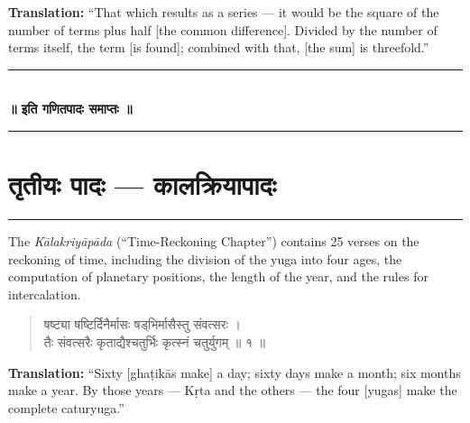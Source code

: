 \documentclass[11pt,a4paper]{article}
\newcommand{\dev}[1]{{\devanagarifont #1}}
\newenvironment{sanskritverse}{\begin{verse}\devanagarifont\large\centering}{\end{verse}}
\begin{document}
\vspace{0.3cm}
\noindent\textbf{Translation:} ``That which results as a series --- it would be the square of the number of terms plus half [the common difference]. Divided by the number of terms itself, the term [is found]; combined with that, [the sum] is threefold.''

\vspace{0.5cm}

\begin{center}
\textcolor{rulecolor}{\rule{0.6\textwidth}{0.4pt}}\\[0.5em]
\textbf{\dev{॥ इति गणितपादः समाप्तः ॥}}\\[0.3em]
\textcolor{rulecolor}{\rule{0.6\textwidth}{0.4pt}}
\end{center}

\clearpage

\section*{\dev{तृतीयः पादः — कालक्रियापादः}}

\begin{center}
\textcolor{rulecolor}{\rule{0.8\textwidth}{0.6pt}}
\end{center}

\noindent
The \textit{Kālakriyāpāda} (``Time-Reckoning Chapter'') contains 25 verses on the reckoning of time, including the division of the yuga into four ages, the computation of planetary positions, the length of the year, and the rules for intercalation.

\vspace{0.3cm}

\begin{tcolorbox}[colback=white,colframe=rulecolor,title={\dev{\textbf{कालक्रिया १ — कालप्रमाणम् (Measure of Time)}}}]
\begin{sanskritverse}
\dev{षष्ट्या षष्टिर्दिनैर्मासः षड्‌भिर्मासैस्तु संवत्सरः ।\\
तैः संवत्सरैः कृताद्यैश्चतुर्भिः कृत्स्नं चतुर्युगम् ॥ १ ॥}
\end{sanskritverse}
\end{tcolorbox}

\vspace{0.3cm}
\noindent\textbf{Translation:} ``Sixty [ghaṭikās make] a day; sixty days make a month; six months make a year. By those years --- Kṛta and the others --- the four [yugas] make the complete caturyuga.''
\end{document}
